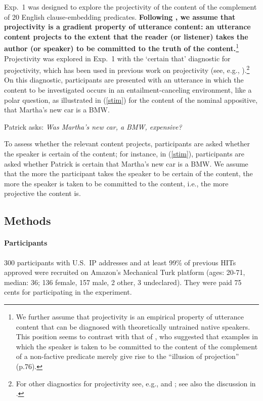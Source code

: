 \documentclass[11pt,fleqn]{article}
\newcommand{\6}{\mbox{$[\hspace*{-.6mm}[$}}
\newcommand{\9}{\mbox{$]\hspace*{-.6mm}]$}}
\begin{document}
Exp.~1 was designed to explore the projectivity of the content of the complement of 20 English clause-embedding predicates. {\bf Following \citealt{tbd-variability}, we assume that projectivity is a gradient property of utterance content: an utterance content projects to the extent that the reader (or listener) takes the author (or speaker) to be committed to the truth of the content.}\footnote{We further assume that projectivity is an empirical property of utterance content that can be diagnosed with theoretically untrained native speakers. This position seems to contrast with that of \citet{anand-hacquard2014}, who suggested that examples in which the speaker is taken to be committed to the content of the complement of a non-factive predicate merely give rise to the ``illusion of projection'' (p.76).} Projectivity was explored in Exp.~1 with the `certain that' diagnostic for projectivity, which has been used in previous work on projectivity (see, e.g., \citealt{tonhauser-salt26,djaerv-bacovcin-salt27,stevens-etal2017,tbd-variability}).\footnote{For other diagnostics for projectivity see, e.g., \citealt{smith-hall11,xue-onea11} and \citealt{brst-lang11}; see also the discussion in \citealt{tbd-variability}.} On this diagnostic, participants are presented with an utterance in which the content to be investigated occurs in an entailment-canceling environment, like a polar question, as illustrated in (\ref{stim}) for the content of the nominal appositive, that Martha's new car is a BMW. 

\begin{exe}

\ex\label{stim} Patrick asks: {\em Was Martha's new car, a BMW, expensive?} 

\end{exe}
To assess whether the relevant content projects, participants are asked whether the speaker is certain of the content; for instance, in (\ref{stim}), participants are asked whether Patrick is certain that Martha's new car is a BMW. We assume that the more the participant takes the speaker to be certain of the content, the more the speaker is taken to be committed to the content, i.e., the more projective the content is.
 

\subsection{Methods}

\paragraph{Participants} 300 participants with U.S.\ IP addresses and at least 99\% of previous HITs approved were recruited on Amazon's Mechanical Turk platform (ages: 20-71, median: 36; 136 female, 157 male, 2 other, 3 undeclared). They were paid 75 cents for participating in the experiment.
\end{document}
